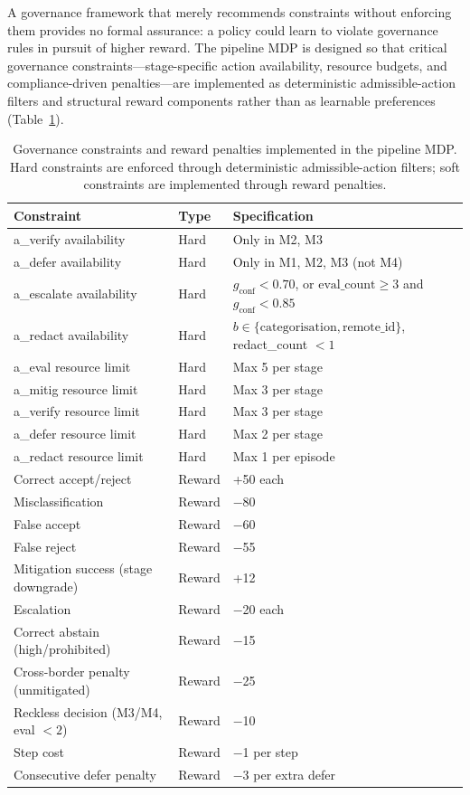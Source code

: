 \documentclass{article}
\begin{document}
A governance framework that merely recommends constraints without enforcing them provides no formal assurance: a policy could learn to violate governance rules in pursuit of higher reward. The pipeline MDP is designed so that critical governance constraints—stage-specific action availability, resource budgets, and compliance-driven penalties—are implemented as deterministic admissible-action filters and structural reward components rather than as learnable preferences (Table~\ref{tab:constraints}).

\begin{table}[t]
\centering
\caption{Governance constraints and reward penalties implemented in the pipeline MDP. Hard constraints are enforced through deterministic admissible-action filters; soft constraints are implemented through reward penalties.}
\small
\begin{tabular}{lll}
\hline
Constraint & Type & Specification \\
\hline
a\_verify availability & Hard & Only in M2, M3 \\
a\_defer availability & Hard & Only in M1, M2, M3 (not M4) \\
a\_escalate availability & Hard & $g_{\mathrm{conf}} < 0.70$, or $\text{eval\_count} \geq 3$ and $g_{\mathrm{conf}} < 0.85$ \\
a\_redact availability & Hard & $b \in \{\text{categorisation}, \text{remote\_id}\}$, redact\_count $< 1$ \\
a\_eval resource limit & Hard & Max 5 per stage \\
a\_mitig resource limit & Hard & Max 3 per stage \\
a\_verify resource limit & Hard & Max 3 per stage \\
a\_defer resource limit & Hard & Max 2 per stage \\
a\_redact resource limit & Hard & Max 1 per episode \\
\hline
Correct accept/reject & Reward & +50 each \\
Misclassification & Reward & $-$80 \\
False accept & Reward & $-$60 \\
False reject & Reward & $-$55 \\
Mitigation success (stage downgrade) & Reward & +12 \\
Escalation & Reward & $-$20 each \\
Correct abstain (high/prohibited) & Reward & $-$15 \\
Cross-border penalty (unmitigated) & Reward & $-$25 \\
Reckless decision (M3/M4, eval $< 2$) & Reward & $-$10 \\
Step cost & Reward & $-$1 per step \\
Consecutive defer penalty & Reward & $-$3 per extra defer \\
\hline
\end{tabular}
\label{tab:constraints}
\end{table}
\end{document}
